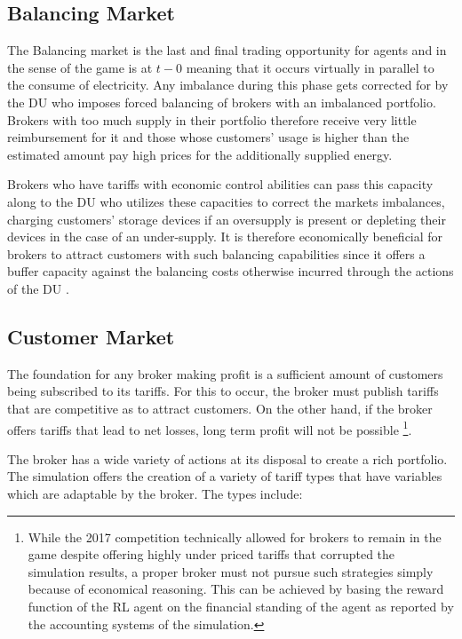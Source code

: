 \subsection{Balancing Market}
The Balancing market is the last and final trading opportunity for agents and in the sense of the game is at $t-0$ meaning that it occurs virtually in parallel to the consume of electricity. Any imbalance during this phase gets corrected for by the \ac{DU} who imposes forced balancing of brokers with an imbalanced portfolio. Brokers with too much supply in their portfolio therefore receive very little reimbursement for it and those whose customers' usage is higher than the estimated amount pay high prices for the additionally supplied energy. 

Brokers who have tariffs with economic control abilities can pass this capacity along to the \ac{DU} who utilizes these capacities to correct the markets imbalances, charging customers' storage devices if an oversupply is present or depleting their devices in the case of an under-supply. It is therefore economically beneficial for brokers to attract customers with such balancing capabilities since it offers a buffer capacity against the balancing costs otherwise incurred through the actions of the \ac{DU} \cite[p.5]{ketter2018powertac} .  





\subsection{Customer Market}

The foundation for any broker making profit is a sufficient amount of customers being subscribed to its tariffs. For this to occur, the broker must publish tariffs that are competitive as to attract customers. On the other hand, if the broker offers tariffs that lead to net losses, long term profit will not be possible
\footnote{While the 2017 competition technically allowed for brokers to remain in the game despite offering highly under priced tariffs that corrupted the simulation results, a proper broker must not pursue such strategies simply because of economical reasoning. %
This can be achieved by basing the reward function of the \ac{RL} agent on the financial standing of the agent as reported by the accounting systems of the simulation.}.

The broker has a wide variety of actions at its disposal to create a rich portfolio. The simulation offers the creation of a variety of tariff types that have variables which are adaptable by the broker. The types include:
	
